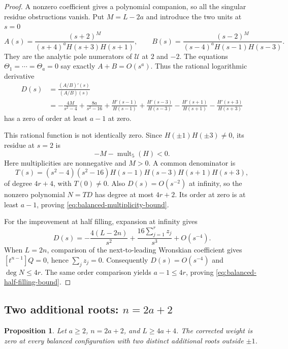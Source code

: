 \documentclass[11pt]{article}
\newtheorem{proposition}{Proposition}[section]
\theoremstyle{definition}
\begin{document}
\begin{proof}
A nonzero coefficient gives a polynomial companion, so all the
singular residue obstructions vanish. Put $M=L-2a$ and introduce
the two units at $s=0$
\[
 A(s)=\frac{(s+2)^M}{(s+4)^aH(s+3)H(s+1)},\qquad
 B(s)=\frac{(s-2)^M}{(s-4)^aH(s-1)H(s-3)}.
\]
They are the analytic pole numerators of $\mathcal U$ at $2$ and
$-2$. The equations $\Theta_1=\cdots=\Theta_a=0$ say exactly
$A+B=O(s^a)$. Thus the rational logarithmic derivative
\[
 \begin{aligned}
 D(s)&=\frac{(A/B)'(s)}{(A/B)(s)}\\
 &=-\frac{4M}{s^2-4}+\frac{8a}{s^2-16}
   +\frac{H'(s-1)}{H(s-1)}+\frac{H'(s-3)}{H(s-3)}
   -\frac{H'(s+1)}{H(s+1)}-\frac{H'(s+3)}{H(s+3)}
 \end{aligned}
\]
has a zero of order at least $a-1$ at zero.

This rational function is not identically zero. Since
$H(\pm1)H(\pm3)\ne0$, its residue at $s=2$ is
\[
 -M-\operatorname{mult}_{5}(H)<0.
\]
Here multiplicities are nonnegative and $M>0$. A common denominator is
\[
 T(s)=(s^2-4)(s^2-16)
       H(s-1)H(s-3)H(s+1)H(s+3),
\]
of degree $4r+4$, with $T(0)\ne0$. Also $D(s)=O(s^{-2})$ at
infinity, so the nonzero polynomial $N=T D$ has degree at most
$4r+2$. Its order at zero is at least $a-1$, proving
\eqref{eq:balanced-multiplicity-bound}.

For the improvement at half filling, expansion at infinity gives
\[
 D(s)=-\frac{4(L-2n)}{s^2}
       +\frac{16\sum_{j=1}^r z_j}{s^3}+O(s^{-4}).
\]
When $L=2n$, comparison of the next-to-leading Wronskian coefficient
gives $[t^{n-1}]Q=0$, hence $\sum_j z_j=0$.
Consequently $D(s)=O(s^{-4})$ and $\deg N\le4r$.
The same order comparison yields $a-1\le4r$, proving
\eqref{eq:balanced-half-filling-bound}.
\end{proof}

\subsection{Two additional roots: $n=2a+2$}

\begin{proposition}\label{prop:balanced-two-additional-roots}
Let $a\ge2$, $n=2a+2$, and $L\ge4a+4$. The corrected weight is zero
at every balanced configuration with two distinct additional roots
outside $\pm1$.
\end{proposition}
\end{document}
